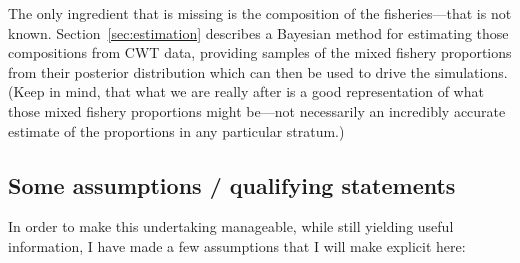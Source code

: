 \documentclass[11pt]{article}
\begin{document}
The only ingredient that is missing is the composition of the
fisheries---that is not known. Section~\ref{sec:estimation} describes a Bayesian method for
estimating those compositions from CWT data, providing samples of the mixed fishery proportions
from their posterior distribution which can then be used to drive the simulations.  (Keep in mind,
that what we are really after is a good representation of what those mixed fishery proportions
might be---not necessarily an incredibly accurate estimate of the proportions in any particular
stratum.)

\subsection{Some assumptions / qualifying statements}

In order to make this undertaking manageable, while still yielding useful information, I have made
a few assumptions that I will make explicit here:
\end{document}
